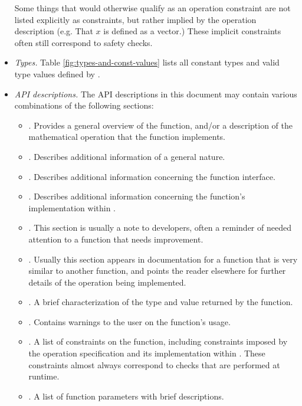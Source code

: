 \begin{itemize}
Some things that would otherwise qualify as an operation constraint
are not listed explicitly as constraints, but rather implied by the
operation description (e.g. That $ x $ is defined as a vector.)
These implicit constraints often still correspond to safety checks.

\item
{\em Types.}
Table \ref{fig:types-and-const-values} lists all constant types
and valid type values defined by \libflamens.

\item
{\em API descriptions.}
The API descriptions in this document may contain various combinations
of the following sections:
\begin{itemize}
\item
\textpurpose.
Provides a general overview of the function, and/or a description of the
mathematical operation that the function implements.
\item
\textnotes.
Describes additional information of a general nature.
\item
\textifacenotes.
Describes additional information concerning the function interface.
\item
\textimplnotes.
Describes additional information concerning the function's implementation
within \libflamens.
\item
\textdevnotes.
This section is usually a note to developers, often a reminder of needed
attention to a function that needs improvement.
\item
\textmoreinfo.
Usually this section appears in documentation for a function that is very
similar to another function, and points the reader elsewhere for further
details of the operation being implemented. 
\item
\textrvalue.
A brief characterization of the type and value returned by the function.
\item
\textcaveats.
Contains warnings to the user on the function's usage.
\item
\textchecks.
A list of constraints on the function, including constraints imposed by the
operation specification and its implementation within \libflamens.
These constraints almost always correspond to checks that are performed at
runtime.
\item
\textparams.
A list of function parameters with brief descriptions.
\end{itemize}

\end{itemize}





